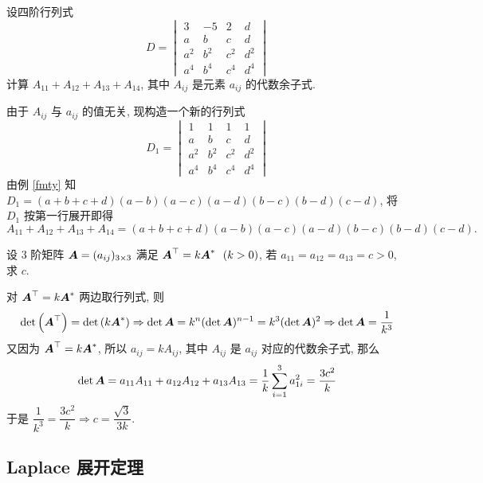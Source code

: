\begin{example}[2010 云南大学]
    设四阶行列式
    $$D=\begin{vmatrix}
            3   & -5  & 2   & d   \\
            a   & b   & c   & d   \\
            a^2 & b^2 & c^2 & d^2 \\
            a^4 & b^4 & c^4 & d^4
        \end{vmatrix}$$
    计算 $A_{11}+A_{12}+A_{13}+A_{14}$, 其中 $A_{ij}$ 是元素 $a_{ij}$ 的代数余子式.
\end{example}
\begin{solution}
    由于 $A_{ij}$ 与 $a_{ij}$ 的值无关, 现构造一个新的行列式
    $$D_1=\begin{vmatrix}
            1   & 1   & 1   & 1   \\
            a   & b   & c   & d   \\
            a^2 & b^2 & c^2 & d^2 \\
            a^4 & b^4 & c^4 & d^4
        \end{vmatrix}$$
        由例 \ref{fmty} 知 $D_1=(a+b+c+d)(a-b)(a-c)(a-d)(b-c)(b-d)(c-d)$, 
        将 $D_1$ 按第一行展开即得 
        $$A_{11}+A_{12}+A_{13}+A_{14}=(a+b+c+d)(a-b)(a-c)(a-d)(b-c)(b-d)(c-d).$$
\end{solution}

\begin{example}
    设 3 阶矩阵 $\vb*{A}=(a_{ij})_{3\times 3}$ 满足 $\vb*{A}^\top=k\vb*{A}^*~~(k>0)$, 若 $a_{11}=a_{12}=a_{13}=c>0$, 求 $c.$
\end{example}
\begin{solution}
    对 $\vb*{A}^\top=k\vb*{A}^*$ 两边取行列式, 则 $$\det\qty(\vb*{A}^\top)=\det\qty(k\vb*{A}^*)\Rightarrow \det\vb*{A}=k^n(\det\vb*{A})^{n-1}=k^3(\det\vb*{A})^2\Rightarrow \det\vb*{A}=\dfrac{1}{k^3}$$
    又因为 $\vb*{A}^\top=k\vb*{A}^*$, 所以 $a_{ij}=kA_{ij}$, 其中 $A_{ij}$ 是 $a_{ij}$ 对应的代数余子式, 那么 $$\det\vb*{A}=a_{11}A_{11}+a_{12}A_{12}+a_{13}A_{13}=\dfrac{1}{k}\sum_{i=1}^{3}a_{1i}^2=\dfrac{3c^2}{k}$$
    于是 $\dfrac{1}{k^3}=\dfrac{3c^2}{k}\Rightarrow c=\dfrac{\sqrt{3}}{3k}.$
\end{solution}

\subsection{Laplace 展开定理}

